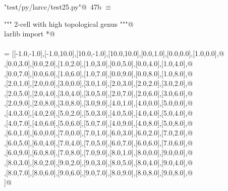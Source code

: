 \documentclass[11pt,oneside]{article}	%
\begin{document}
\begin{flushleft} \small \label{scrap79}
\protect{}\verb@"test/py/larcc/test25.py"@\nobreak\ {\footnotesize 47b }$\equiv$
\vspace{-1ex}
\begin{list}{}{} \item
\mbox{}\verb@""" 2-cell with high topological genus """@\\
\mbox{}\verb@from larlib import *@\\
\mbox{}\verb@@\\
\mbox{}\verb@V = [[-1.0,-1.0],[-1.0,10.0],[10.0,-1.0],[10.0,10.0],[0.0,1.0],[0.0,0.0],[1.0,0.0],@\\
\mbox{}\verb@[1.0,1.0],[0.0,3.0],[0.0,2.0],[1.0,2.0],[1.0,3.0],[0.0,5.0],[0.0,4.0],[1.0,4.0],@\\
\mbox{}\verb@[1.0,5.0],[0.0,7.0],[0.0,6.0],[1.0,6.0],[1.0,7.0],[0.0,9.0],[0.0,8.0],[1.0,8.0],@\\
\mbox{}\verb@[1.0,9.0],[2.0,1.0],[2.0,0.0],[3.0,0.0],[3.0,1.0],[2.0,3.0],[2.0,2.0],[3.0,2.0],@\\
\mbox{}\verb@[3.0,3.0],[2.0,5.0],[2.0,4.0],[3.0,4.0],[3.0,5.0],[2.0,7.0],[2.0,6.0],[3.0,6.0],@\\
\mbox{}\verb@[3.0,7.0],[2.0,9.0],[2.0,8.0],[3.0,8.0],[3.0,9.0],[4.0,1.0],[4.0,0.0],[5.0,0.0],@\\
\mbox{}\verb@[5.0,1.0],[4.0,3.0],[4.0,2.0],[5.0,2.0],[5.0,3.0],[4.0,5.0],[4.0,4.0],[5.0,4.0],@\\
\mbox{}\verb@[5.0,5.0],[4.0,7.0],[4.0,6.0],[5.0,6.0],[5.0,7.0],[4.0,9.0],[4.0,8.0],[5.0,8.0],@\\
\mbox{}\verb@[5.0,9.0],[6.0,1.0],[6.0,0.0],[7.0,0.0],[7.0,1.0],[6.0,3.0],[6.0,2.0],[7.0,2.0],@\\
\mbox{}\verb@[7.0,3.0],[6.0,5.0],[6.0,4.0],[7.0,4.0],[7.0,5.0],[6.0,7.0],[6.0,6.0],[7.0,6.0],@\\
\mbox{}\verb@[7.0,7.0],[6.0,9.0],[6.0,8.0],[7.0,8.0],[7.0,9.0],[8.0,1.0],[8.0,0.0],[9.0,0.0],@\\
\mbox{}\verb@[9.0,1.0],[8.0,3.0],[8.0,2.0],[9.0,2.0],[9.0,3.0],[8.0,5.0],[8.0,4.0],[9.0,4.0],@\\
\mbox{}\verb@[9.0,5.0],[8.0,7.0],[8.0,6.0],[9.0,6.0],[9.0,7.0],[8.0,9.0],[8.0,8.0],[9.0,8.0],@\\
\mbox{}\verb@[9.0,9.0]]@\\
\mbox{}\verb@@\\

\end{list}
\end{flushleft}
\end{document}
